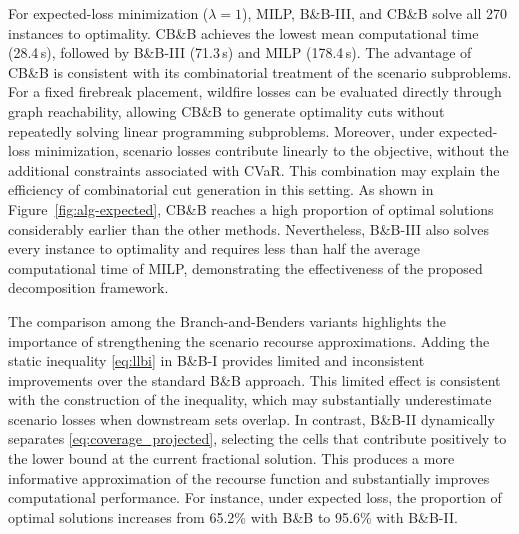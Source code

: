 \documentclass{itor}
\begin{document}
For expected-loss minimization ($\lambda=1$), MILP, B\&B-III, and CB\&B
solve all 270 instances to optimality. CB\&B achieves the lowest mean
computational time (28.4\,s), followed by B\&B-III (71.3\,s) and MILP
(178.4\,s). The advantage of CB\&B is consistent with its combinatorial
treatment of the scenario subproblems. For a fixed firebreak placement,
wildfire losses can be evaluated directly through graph reachability,
allowing CB\&B to generate optimality cuts without repeatedly solving
linear programming subproblems. Moreover, under expected-loss
minimization, scenario losses contribute linearly to the objective,
without the additional constraints associated with CVaR. This
combination may explain the efficiency of combinatorial cut generation
in this setting. As shown in Figure~\ref{fig:alg-expected},
CB\&B reaches a high proportion of optimal solutions considerably
earlier than the other methods. Nevertheless, B\&B-III also solves
every instance to optimality and requires less than half the average
computational time of MILP, demonstrating the effectiveness of the
proposed decomposition framework.

The comparison among the Branch-and-Benders variants highlights the
importance of strengthening the scenario recourse approximations.
Adding the static inequality \eqref{eq:llbi} in
B\&B-I provides limited and inconsistent improvements
over the standard B\&B approach. This limited effect is consistent
with the construction of the inequality, which may substantially
underestimate scenario losses when downstream sets overlap.
In contrast, B\&B-II dynamically separates
\eqref{eq:coverage_projected}, selecting the cells that contribute
positively to the lower bound at the current fractional solution.
This produces a more informative approximation of the recourse
function and substantially improves computational performance.
For instance, under expected loss, the proportion of optimal
solutions increases from 65.2\% with B\&B to 95.6\% with B\&B-II.
\end{document}
